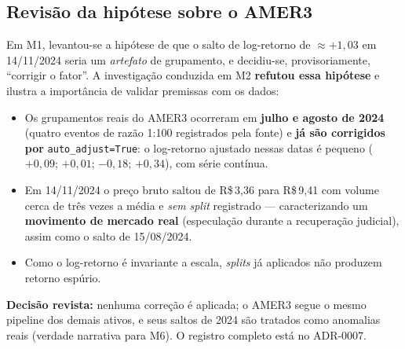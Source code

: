 \subsection{Revisão da hipótese sobre o AMER3}
\label{sec:m2-amer3}
Em M1, levantou-se a hipótese de que o salto de log-retorno de $\approx +1{,}03$ em
14/11/2024 seria um \emph{artefato} de grupamento, e decidiu-se, provisoriamente,
``corrigir o fator''. A investigação conduzida em M2 \textbf{refutou essa hipótese} e
ilustra a importância de validar premissas com os dados:
\begin{itemize}[noitemsep]
  \item Os grupamentos reais do AMER3 ocorreram em \textbf{julho e agosto de 2024} (quatro
        eventos de razão 1:100 registrados pela fonte) e \textbf{já são corrigidos por}
        \texttt{auto\_adjust=True}: o log-retorno ajustado nessas datas é pequeno
        ($+0{,}09$; $+0{,}01$; $-0{,}18$; $+0{,}34$), com série contínua.
  \item Em 14/11/2024 o preço bruto saltou de R\$\,3{,}36 para R\$\,9{,}41 com volume
        cerca de três vezes a média e \emph{sem} \emph{split} registrado --- caracterizando
        um \textbf{movimento de mercado real} (especulação durante a recuperação judicial),
        assim como o salto de 15/08/2024.
  \item Como o log-retorno é invariante a escala, \emph{splits} já aplicados não produzem
        retorno espúrio.
\end{itemize}
\textbf{Decisão revista:} nenhuma correção é aplicada; o AMER3 segue o mesmo pipeline dos
demais ativos, e seus saltos de 2024 são tratados como anomalias reais (verdade narrativa
para M6). O registro completo está no ADR-0007.
